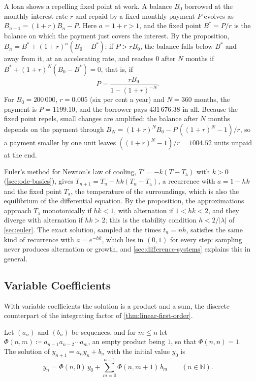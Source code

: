 A loan shows a repelling fixed point at work. A balance $B_0$ borrowed at the monthly interest rate $r$ and repaid by a fixed monthly payment $P$ evolves as $B_{n+1}=(1+r)B_n-P$. Here $a=1+r>1$, and the fixed point $B^*=P/r$ is the balance on which the payment just covers the interest. By the proposition, $B_n=B^*+(1+r)^n(B_0-B^*)$: if $P>rB_0$, the balance falls below $B^*$ and away from it, at an accelerating rate, and reaches $0$ after $N$ months if $B^*+(1+r)^N(B_0-B^*)=0$, that is, if
\[
P=\frac{rB_0}{1-(1+r)^{-N}} .
\]
For $B_0=200\,000$, $r=0.005$ (six per cent a year) and $N=360$ months, the payment is $P=1199.10$, and the borrower pays $431\,676.38$ in all. Because the fixed point repels, small changes are amplified: the balance after $N$ months depends on the payment through $B_N=(1+r)^NB_0-P\,((1+r)^N-1)/r$, so a payment smaller by one unit leaves $((1+r)^N-1)/r=1004.52$ units unpaid at the end.

Euler's method for Newton's law of cooling, $T'=-k(T-T_{\mathrm a})$ with $k>0$ (\cref{sec:ode-basics}), gives $T_{n+1}=T_n-hk(T_n-T_{\mathrm a})$, a recurrence with $a=1-hk$ and the fixed point $T_{\mathrm a}$, the temperature of the surroundings, which is also the equilibrium of the differential equation. By the proposition, the approximations approach $T_{\mathrm a}$ monotonically if $hk<1$, with alternation if $1<hk<2$, and they diverge with alternation if $hk>2$; this is the stability condition $h<2/|\lambda|$ of \cref{sec:euler}. The exact solution, sampled at the times $t_n=nh$, satisfies the same kind of recurrence with $a=e^{-hk}$, which lies in $(0,1)$ for every step: sampling never produces alternation or growth, and \cref{sec:difference-systems} explains this in general.

\subsection{Variable Coefficients}

With variable coefficients the solution is a product and a sum, the discrete counterpart of the integrating factor of \cref{thm:linear-first-order}.

\begin{theorem}
\label{thm:first-order-variable}
Let $(a_n)$ and $(b_n)$ be sequences, and for $m\le n$ let $\Phi(n,m)\coloneqq a_{n-1}a_{n-2}\cdots a_m$, an empty product being $1$, so that $\Phi(n,n)=1$. The solution of $y_{n+1}=a_ny_n+b_n$ with the initial value $y_0$ is
\begin{equation}
y_n=\Phi(n,0)\,y_0+\sum_{m=0}^{n-1}\Phi(n,m+1)\,b_m\qquad(n\in\mathbb N).
\label{eq:first-order-solution}
\end{equation}
\end{theorem}

